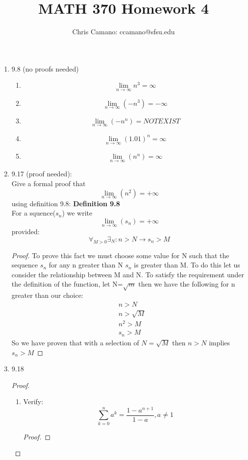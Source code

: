 \documentclass[11pt]{article}
\author{Chris Camano: ccamano@sfsu.edu}
\title{MATH 370  Homework 4}
\date
\theoremstyle{definition}  %
\newcommand{\nlim}{\lim_{n\rightarrow \infty}}
\begin{document}
\maketitle
\begin{enumerate}
  \item 9.8 (no proofs needed)
  \begin{enumerate}
    \item
    \[
      \nlim n^3=\infty
    \]
    \item
    \[
      \nlim (-n^3)=-\infty
    \]
    \item
    \[
      \nlim (-n^n)=NOT EXIST
    \]
    \item
      \[
        \nlim (1.01)^n=\infty
      \]
    \item
    \[
      \nlim(n^n)=\infty
    \]
  \end{enumerate}
  \item  9.17 (proof needed):\\
  Give a formal proof that
  \[
    \lim_{n\rightarrow \infty}(n^2)=+\infty
  \]
  using definition 9.8:
  \textbf{Definition 9.8}\\
  For a squence($s_n$) we write $$\nlim(s_n)=+\infty$$ provided: $$\forall_{M>0}\exists_{N}:n>N\rightarrow s_n>M$$
  \begin{proof}
    To prove this fact we must choose some value for N such that the sequence $s_n$ for any n greater than N $s_n$ is greater than M. To do this let us consider the relationship between M and N. To satisfy the requirement under the definition of the function, let N=$\sqrt{m}$ then we have the following for n greater than our choice:
    \begin{align*}
      &n>N\\
      &n>\sqrt{M}\\
      &n^2> M\\
      &s_n>M
    \end{align*}
    So we have proven that with a selection of $N=\sqrt{M}$ then $n>N$ implies $s_n>M$
  \end{proof}
  \item 9.18
  \begin{proof}
    \begin{enumerate}
      \item Verify:
      \[
        \sum_{k=0}^na^k=\frac{1-a^{n+1}}{1-a}, a\neq 1
      \]
      \begin{proof}

\end{proof}
\end{enumerate}
\end{proof}
\end{enumerate}
\end{document}
